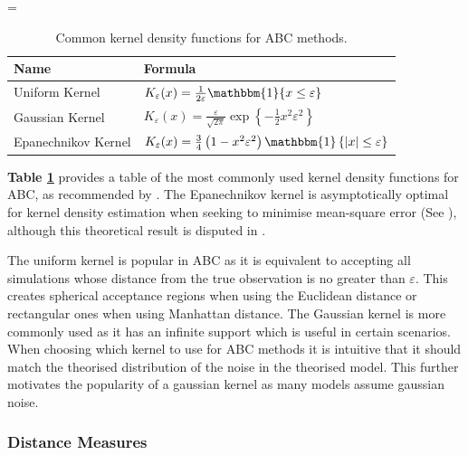 \documentclass[11pt,a4paper]{article}
\theoremstyle{break}
\begin{document}
  \begin{table}
    \everymath={\displaystyle}
    \centering
    \begin{tabular}{|l|l|}
      \hline
      \textbf{Name}&\textbf{Formula}\\\hline
      Uniform Kernel&$K_\varepsilon(x)=\frac1{2\varepsilon}\mathbbm{1}\{x\leq\varepsilon\}$\\\hline
      Gaussian Kernel&$K_\varepsilon(x)=\frac\varepsilon{\sqrt{2\pi}}\exp\left\{-\frac12x^2\varepsilon^2\right\}$\\\hline
      Epanechnikov Kernel&$K_\varepsilon(x)=\frac34\left(1-x^2\varepsilon^2\right)\mathbbm{1}\left\{|x|\leq\varepsilon\right\}$\\
      \hline
    \end{tabular}
    \caption{Common kernel density functions for ABC methods.\protect\footnotemark}
    \label{tab_common_kernels}
  \end{table}

  \par \textbf{Table \ref{tab_common_kernels}} provides a table of the most commonly used kernel density functions for ABC, as recommended by \cite[]{annual_review_of_statistics_ABC}. The Epanechnikov kernel is asymptotically optimal for kernel density estimation when seeking to minimise mean-square error (See \cite[]{non_parameteric_estimation_of_a_multivariate_probability_density}), although this theoretical result is disputed in \cite[]{introduction_to_nonparametric_estimation}.

  \par The uniform kernel is popular in ABC as it is equivalent to accepting all simulations whose distance from the true observation is no greater than $\varepsilon$. This creates spherical acceptance regions when using the Euclidean distance or rectangular ones when using Manhattan distance. The Gaussian kernel is more commonly used as it has an infinite support which is useful in certain scenarios. When choosing which kernel to use for ABC methods it is intuitive that it should match the theorised distribution of the noise in the theorised model. This further motivates the popularity of a gaussian kernel as many models assume gaussian noise.

\subsubsection*{Distance Measures}\label{sec_distance_measures}
\end{document}
